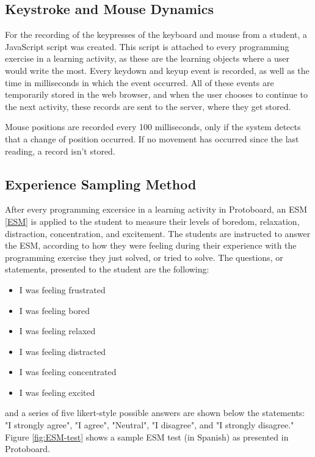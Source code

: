 \documentclass{acm_proc_article-sp}
\begin{document}

\subsection{Keystroke and Mouse Dynamics}

For the recording of the keypresses of the keyboard and mouse from a
student, a JavaScript script was created. This script is attached to
every programming exercise in a learning activity, as these are the
learning objects where a user would write the most. Every keydown and
keyup event is recorded, as well as the time in milliseconds in which the event
occurred. All of these events are temporarily stored in the web
browser, and when the user chooses to continue to the next activity,
these records are sent to the server, where they get stored.

Mouse positions are recorded every 100 milliseconds, only if the
system detects that a change of position occurred. If no movement has
occurred since the last reading, a record isn't stored.


\subsection{Experience Sampling Method}
\label{PM-ESM}

After every programming excersice in a learning activity in
Protoboard, an ESM \ref{ESM} is applied to the student to measure their levels
of boredom, relaxation, distraction, concentration, and
excitement. The students are instructed to answer the ESM,
according to how they were feeling during their experience with the
programming exercise they just solved, or tried to solve. The
questions, or statements, presented to the student are the following:

\begin{itemize}
  \item I was feeling frustrated
  \item I was feeling bored
  \item I was feeling relaxed
  \item I was feeling distracted
  \item I was feeling concentrated
  \item I was feeling excited
\end{itemize}

and a series of five likert-style possible answers are shown below the
statements: "I strongly agree", "I agree", "Neutral", "I disagree",
and "I strongly disagree." Figure \ref{fig:ESM-test} shows a sample
ESM test (in Spanish) as presented in Protoboard.
\end{document}
